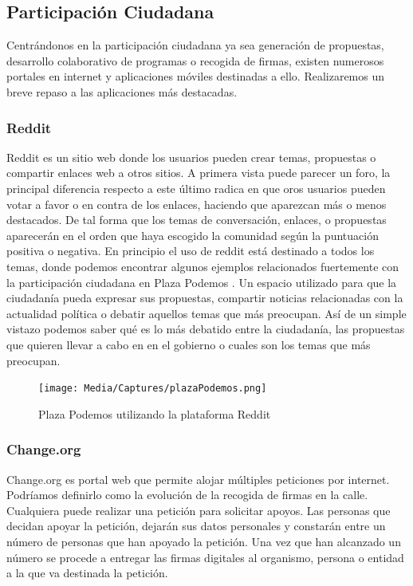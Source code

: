 \subsection{Participación Ciudadana}

Centrándonos en la participación ciudadana ya sea generación de propuestas, desarrollo colaborativo de programas o recogida de firmas, existen numerosos portales en internet y aplicaciones móviles destinadas a ello. Realizaremos un breve repaso a las aplicaciones más destacadas.

\subsubsection{Reddit}

Reddit \cite{ref:reddit} es un sitio web donde los usuarios pueden crear temas, propuestas o compartir enlaces web a otros sitios. A primera vista puede parecer un foro, la principal diferencia respecto a este último radica en que oros usuarios pueden votar a favor o en contra de los enlaces, haciendo que aparezcan más o menos destacados. De tal forma que los temas de conversación, enlaces, o propuestas aparecerán en el orden que haya escogido la comunidad según la puntuación positiva o negativa.
En principio el uso de reddit está destinado a todos los temas, donde podemos encontrar algunos ejemplos relacionados fuertemente con la participación ciudadana en Plaza Podemos \cite{ref:plazaPodemos}. Un espacio utilizado para que la ciudadanía pueda expresar sus propuestas, compartir noticias relacionadas con la actualidad política o debatir aquellos temas que más preocupan. Así de un simple vistazo podemos saber qué es lo más debatido entre la ciudadanía, las propuestas que quieren llevar a cabo en en el gobierno o cuales son los temas que más preocupan.

\begin{figure}[H]
\centering
\texttt{[image: Media/Captures/plazaPodemos.png]}
\caption{Plaza Podemos utilizando la plataforma Reddit}
\label{fig:plazaPodemos}
\end{figure}

\subsubsection{Change.org}

Change.org \cite{ref:changeOrg} es portal web que permite alojar múltiples peticiones por internet. Podríamos definirlo como la evolución de la recogida de firmas en la calle. Cualquiera puede realizar una petición para solicitar apoyos. Las personas que decidan apoyar la petición, dejarán sus datos personales y constarán entre un número de personas que han apoyado la petición. Una vez que han alcanzado un número se procede a entregar las firmas digitales al organismo, persona o entidad a la que va destinada la petición.

